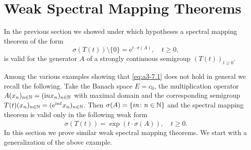 \section{Weak Spectral Mapping Theorems}\label{sec:a3-7}
In the previous section we showed under which hypotheses a spectral mapping theorem of the form
\begin{equation}\label{eq:a3-7.1}
\sigma(T(t)) \setminus \{0\} = \mathrm{e}^{t \cdot \sigma(A)}, \quad t \geq 0 ,
\end{equation}
is valid for the generator $A$ of a strongly continuous semigroup $(T(t))_{t\geq 0}$.

Among the various examples showing that \eqref{eq:a3-7.1} does not hold in general we recall the following.
Take the Banach space $E = c_{0}$, the multiplication operator $A(x_{n})_{n\in\mathbb{N}} = (\mathrm{i} n x_{n})_{n\in\mathbb{N}}$ with maximal domain and the corresponding semigroup $T(t)(x_{n})_{n \in \mathbb{N}} = 
(\mathrm{e}^{\mathrm{i} nt}x_{n})_{n \in \mathbb{N}}$.
Then $\sigma(A) = \{in \colon n \in \mathbb{N}\}$ and the spectral mapping theorem is valid only in the following weak form
\begin{equation}\label{eq:a3-7.2}
\sigma(T(t)) = \overline{\exp(t\cdot\sigma(A))}, \quad t \geq 0 .
\end{equation}
In this section we prove similar weak spectral mapping theorems.
We start with a generalization of the above example.

